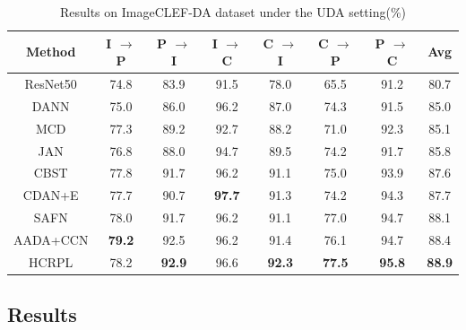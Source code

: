 \documentclass[a4paper,fleqn]{cas-dc}
\begin{document}
	
	\begin{center}
	\begin{table}
		\small
		\centering
		\caption{Results on ImageCLEF-DA dataset under the UDA setting(\%)}	
		\begin{tabular*}{\hsize}{@{}@{\extracolsep{\fill}}cccccccc@{}}
			\toprule
			Method & I $\rightarrow$ P & P $\rightarrow$ I & I $\rightarrow$ C & C $\rightarrow$ I & C $\rightarrow$ P & P $\rightarrow$ C & Avg\\
			\midrule
			ResNet50 \cite{he2016deep} & 74.8 & 83.9 & 91.5 & 78.0 & 65.5 & 91.2 & 80.7\\
			DANN \cite{ganin2016domain} & 75.0 & 86.0 & 96.2 & 87.0 & 74.3 & 91.5 & 85.0 \\
			MCD \cite{saito2018maximum} & 77.3 & 89.2 & 92.7 & 88.2 & 71.0 & 92.3 & 85.1 \\
			JAN \cite{long2017deep} & 76.8 & 88.0 & 94.7 & 89.5 & 74.2 & 91.7 & 85.8 \\
			CBST \cite{zou2018domain} & 77.8 & 91.7 & 96.2 & 91.1 & 75.0 & 93.9 & 87.6 \\
			CDAN+E \cite{long2018conditional} & 77.7 & 90.7 & \textbf{97.7} & 91.3 & 74.2 & 94.3 & 87.7 \\
			SAFN \cite{xu2019larger} & 78.0 & 91.7 & 96.2 & 91.1 & 77.0 & 94.7 & 88.1 \\
			AADA+CCN \cite{yang2020mind} & \textbf{79.2} & 92.5 & 96.2 & 91.4 & 76.1 & 94.7 & 88.4 \\
			\midrule
			HCRPL  & 78.2 & \textbf{92.9} & 96.6 & \textbf{92.3} & \textbf{77.5} & \textbf{95.8} & \textbf{88.9} \\
			\bottomrule
		\end{tabular*}
		\label{table5}
	\end{table}
\end{center}

	
	
	\subsection{Results} \label{5.4}
\end{document}
